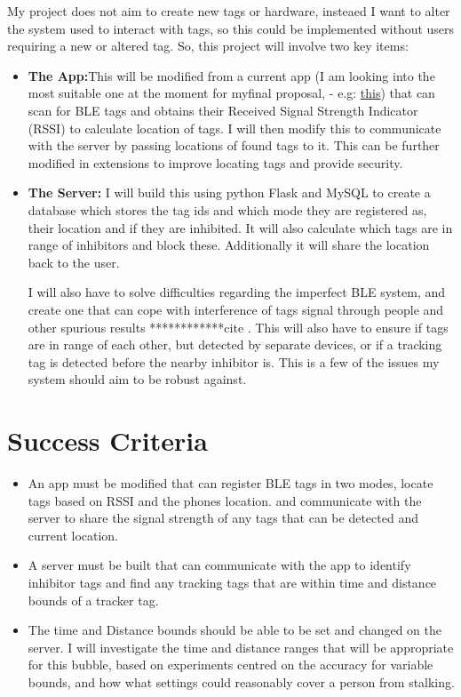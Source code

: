 \documentclass[12pt]{article}
\begin{document}
My project does not aim to create new tags or hardware, insteaed I want to alter the system used to interact with tags, so this could be implemented without users requiring a new or altered tag.
 So, this project will involve two key items:
\begin{itemize}
\item{ {\bf The App:}This will be modified from a current app (I am looking into the most suitable one at the moment for myfinal proposal, - e.g: \href{https://github.com/neXenio/BLE-Indoor-Positioning}{this})  that can scan for BLE tags and obtains their   Received Signal Strength Indicator (RSSI) to calculate location of tags. I will then modify this to communicate with the server by passing locations of found tags to it. This can be further modified in extensions to improve locating tags and provide security.}
\item{{\bf The Server:} I will build this using python Flask and MySQL to create a  database which stores the tag ids and which mode they are registered as, their location and if they are inhibited. It will also calculate which tags are in range of inhibitors and block these. Additionally it will share the location back to the user.}

I will also have to solve difficulties regarding the imperfect BLE system, and create one that can cope with interference of tags signal through people and other spurious results ************cite . This will also have to ensure if tags are in range of each other, but detected by separate devices, or if a tracking tag is detected before the nearby inhibitor is. This is a few of the issues my system should aim to be robust against.


\end{itemize}


\section{Success Criteria}
\begin{itemize}
\item{An app must be modified that can register BLE tags in two modes, locate tags based on RSSI and the phones location.  and communicate with the server to share the signal strength of any tags that can be detected and current location.}

\item{A server must be built that can communicate with the app to identify inhibitor tags and find any tracking tags that are within time  and distance bounds of a tracker tag. }

\item{The time and Distance bounds should be able to be set and changed on the server. I will investigate the time and distance ranges that will be appropriate for this bubble, based on experiments centred on the accuracy for variable bounds, and how what settings could reasonably cover a person from stalking.}

\end{itemize}
\end{document}

